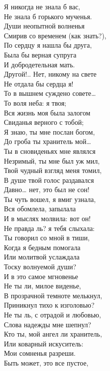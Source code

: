{Я никогда не знала б вас,\\
Не знала б горького мученья.\\
Души неопытной волненья\\
Смирив со временем (как знать?),\\
По сердцу я нашла бы друга,\\
Была бы верная супруга\\
И добродетельная мать.\\
Другой!.. Нет, никому на свете\\
Не отдала бы сердца я!\\
То в вышнем суждено совете…\\
То воля неба: я твоя;\\
Вся жизнь моя была залогом\\
Свиданья верного с тобой;\\
Я знаю, ты мне послан богом,\\
До гроба ты хранитель мой…\\
Ты в сновиденьях мне являлся\\
Незримый, ты мне был уж мил,\\
Твой чудный взгляд меня томил,\\
В душе твой голос раздавался\\
Давно… нет, это был не сон!\\
Ты чуть вошел, я вмиг узнала,\\
Вся обомлела, запылала\\
И в мыслях молвила: вот он!\\
Не правда ль? я тебя слыхала:\\
Ты говорил со мной в тиши,\\
Когда я бедным помогала\\
Или молитвой услаждала\\
Тоску волнуемой души?\\
И в это самое мгновенье\\
Не ты ли, милое виденье,\\
В прозрачной темноте мелькнул,\\
Приникнул тихо к изголовью?\\
Не ты ль, с отрадой и любовью,\\
Слова надежды мне шепнул?\\
Кто ты, мой ангел ли хранитель,\\
Или коварный искуситель:\\
Мои сомненья разреши.\\
Быть может, это все пустое,\\
}
